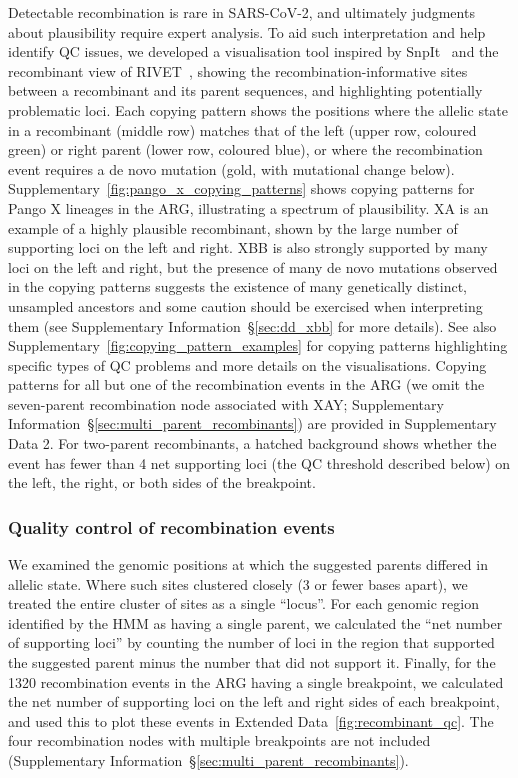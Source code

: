 \documentclass[12pt]{article}
\newcommand{\supref}[1]{Supplementary Information~\S\ref{#1}}
\newcommand{\edref}[1]{Extended Data~\ref{#1}}
\newcommand{\siref}[1]{Supplementary~\ref{#1}}
\begin{document}
Detectable recombination is rare in SARS-CoV-2, and
ultimately judgments about plausibility require expert analysis.
To aid such interpretation and help identify QC issues,
we developed a visualisation tool
inspired by SnpIt~\cite{OToole2024} and
the recombinant view of RIVET~\cite{Smith2023tracking},
showing the recombination-informative sites
between a recombinant and its parent sequences, and
highlighting potentially problematic loci.
Each copying pattern shows the positions
where the allelic state
in a recombinant (middle row) matches that of
the left (upper row, coloured green)
or right parent (lower row, coloured blue),
or where the recombination event requires
a de novo mutation (gold, with mutational change below).
\siref{fig:pango_x_copying_patterns}
shows copying patterns for Pango X lineages in the ARG,
illustrating a spectrum of plausibility.
XA is an example of a highly plausible recombinant,
shown by the large number of supporting loci on the left and right.
XBB is also strongly supported by many loci on the left and right,
but the presence of many de novo mutations
observed in the copying patterns suggests the existence of
many genetically distinct, unsampled ancestors
and some caution should be exercised when interpreting them
(see \supref{sec:dd_xbb} for more details).
See also \siref{fig:copying_pattern_examples} for copying patterns
highlighting specific types of QC problems
and more details on the visualisations.
Copying patterns for all but one of the recombination events in the ARG
(we omit the seven-parent recombination node associated with XAY;
\supref{sec:multi_parent_recombinants})
are provided in Supplementary Data 2.
For two-parent recombinants, a hatched background shows whether
the event has fewer than 4 net supporting loci
(the QC threshold described below)
on the left, the right, or both sides of the breakpoint.

\subsubsection*{Quality control of recombination events}

We examined the genomic positions
at which the suggested parents differed in allelic state.
Where such sites clustered closely (3 or fewer bases apart),
we treated the entire cluster of sites as a single ``locus''.
For each genomic region identified by the HMM as having a single parent,
we calculated the ``net number of supporting loci''
by counting the number of loci in the region
that supported the suggested parent minus the number that did not support it.
Finally, for the 1320 recombination events in the ARG having a single breakpoint,
we calculated the net number of supporting loci
on the left and right sides of each breakpoint, and
used this to plot these events in \edref{fig:recombinant_qc}.
The four recombination nodes with multiple breakpoints are not included
(\supref{sec:multi_parent_recombinants}).
\end{document}
